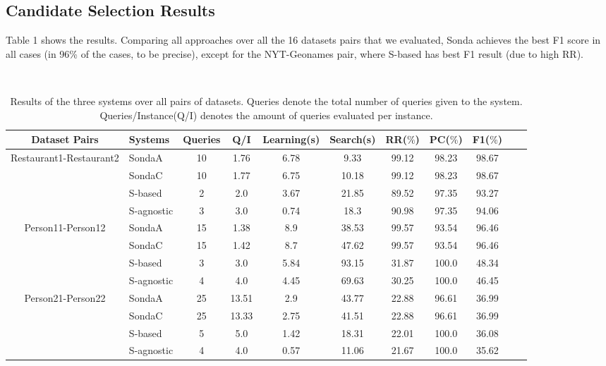 \subsection{Candidate Selection Results} 
Table 1 shows the results. Comparing all approaches over all the 16 datasets pairs that we evaluated, Sonda achieves the best F1 score in all cases (in 96\% of the cases, to be precise), except for the NYT-Geonames pair, where S-based has best F1 result (due to high RR). 
 
\begin{center}
\begin{table*}[h]
\centering
\scriptsize\tt
\caption{Results of the three systems over all pairs of datasets. Queries denote the total number of queries given to the system. Queries/Instance(Q/I) denotes the amount of queries evaluated per instance.} 
    \begin{tabular}{|c|l|c|c|c|c|c|c|c|c|c|}
        \hline
        Dataset Pairs & Systems & Queries & Q/I & Learning(s) & Search(s)  & RR($\%$) & PC($\%$) &  F1($\%$) \\ \hline

\multirow{4}{*}{Restaurant1-Restaurant2} & SondaA     & 10 & 1.76   & 6.78  & 9.33  & 99.12 & 98.23 & 98.67       \\
											& SondaC    & 10 & 1.77   & 6.75  & 10.18 & 99.12 & 98.23 & 98.67\\
											& S-based   & 2 & 2.0   & 3.67  & 21.85 &   89.52 & 97.35 & 93.27\\
 											& S-agnostic & 3 & 3.0   & 0.74  & 18.3    & 90.98 & 97.35 & 94.06   \\ \hline
 											
\multirow{4}{*}{Person11-Person12} & SondaA    & 15 & 1.38   & 8.9  & 38.53   & 99.57 & 93.54 & 96.46 \\
											& SondaC   & 15 & 1.42   & 8.7  & 47.62  & 99.57 & 93.54 & 96.46 \\
											& S-based   & 3 & 3.0   & 5.84  & 93.15  & 31.87 & 100.0 & 48.34\\
 											& S-agnostic   & 4 & 4.0   & 4.45  & 69.63      & 30.25 & 100.0 & 46.45 \\ \hline

\multirow{4}{*}{Person21-Person22} & SondaA  & 25 & 13.51   & 2.9  & 43.77   & 22.88 & 96.61 & 36.99 \\
											& SondaC    & 25 & 13.33   & 2.75  & 41.51 & 22.88 & 96.61 & 36.99\\
											& S-based   & 5 & 5.0   & 1.42  & 18.31  & 22.01 & 100.0 & 36.08\\
 											& S-agnostic     & 4 & 4.0   & 0.57  & 11.06  & 21.67 & 100.0 & 35.62  	\\ \hline 										


\end{tabular}
\end{table*}
\end{center}
